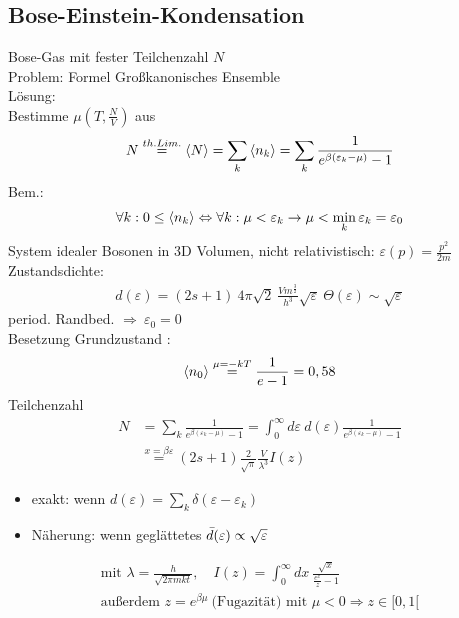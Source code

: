 \subsection{Bose-Einstein-Kondensation} 
Bose-Gas mit fester Teilchenzahl $N$\\
Problem: Formel Großkanonisches Ensemble\\
Lösung:\\
Bestimme $\mu(T,\frac{N}{V})$ aus
\begin{align}
    N \overset{th. Lim.}{=} \expval{N} = \sum_k \expval{n_k} = \sum_k \frac{1}{e^{\beta(\varepsilon_k-\mu)}-1}
\end{align}
Bem.:
\begin{align}
    \forall k: \space 0 \leq \expval{n_k} \Leftrightarrow \forall k: \mu < \varepsilon_k \rightarrow \mu < \min_k \varepsilon_k= \varepsilon_0 
\end{align}
System idealer Bosonen in 3D Volumen, nicht relativistisch: $\varepsilon(p)=\frac{p^2}{2m}$\\
Zustandsdichte:
\begin{align}
    d(\varepsilon)=(2s+1) \ 4\pi \sqrt{2} \ \frac{Vm^{\frac{3}{2}}}{h^3} \sqrt{\varepsilon} \ \Theta(\varepsilon) \sim \sqrt{\varepsilon}
\end{align}
period. Randbed. $\Rightarrow \ \varepsilon_0=0$\\
Besetzung Grundzustand :
\begin{align}
    \expval{n_0} \stackrel{\mu=-kT}{=} \frac{1}{e-1} = 0,58
\end{align}
Teilchenzahl
\begin{align}
    N &= \sum_k \frac{1}{e^{\beta(\varepsilon_k-\mu)}-1}
    =\int_0^{\infty} d\varepsilon \ d(\varepsilon) \frac{1}{e^{\beta(\varepsilon_k-\mu)}-1}\\
    &\overset{x=\beta\varepsilon}{=} (2s+1) \frac{2}{\sqrt{\pi}}\frac{V}{\lambda^3} I(z)
    \label{eq:BEK}
\end{align}
\begin{itemize}
    \item exakt: wenn $d(\varepsilon) = \sum_k \delta(\varepsilon-\varepsilon_k)$
    \item Näherung: wenn geglättetes $\Bar{d}(\varepsilon) \propto \sqrt{\varepsilon}$
\end{itemize}
\begin{align}
    \text{mit } \lambda=\frac{h}{\sqrt{2\pi mkt}}, \quad I(z) = \int_0^{\infty} dx \ \frac{\sqrt{x}}{\frac{e^x}{z}-1}\\
    \text{außerdem } z=e^{\beta \mu} \ \text{(Fugazität) mit } \mu < 0 \Rightarrow z\in [0,1[
\end{align}
